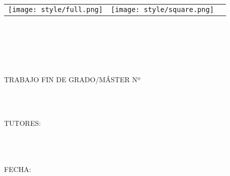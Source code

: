 \begin{titlepage}
    \centering
    \bfseries {
        \null{}
        \vspace{0cm}
        \begin{table}[h]
            \centering
            \begin{tabular}{m{10cm} m{1cm} m{3cm}}
                \vspace{0.2cm}
                \texttt{[image: style/full.png]} &
                \vspace{1.5mm} \texttt{[image: style/square.png]} \\
            \end{tabular}
        \end{table}

        \vspace{3\baselineskip}

        \Large{\ORG{} \\ \vspace{3\baselineskip}}
        \large {
            \AREA{} \\ \vspace{3\baselineskip}
            \subject{} \\ \vspace{2\baselineskip}

            TRABAJO FIN DE GRADO/MÁSTER Nº \tfgId{} \vspace{\baselineskip} \\
            \title{} \\ \vspace{1\baselineskip}

            \author{} \\ \vspace{1\baselineskip}
            TUTORES:\\
            \tutorOne{} \\
            \tutorTwo{} \\
            \tutorThree{} \\ \vspace{\baselineskip}

            \vspace{2\baselineskip}
            FECHA:\@ \date{}
        }
    }
\end{titlepage}
